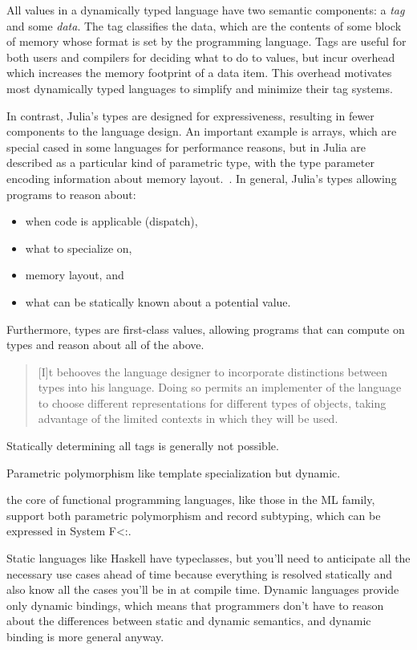 \documentclass[pldi]{sigplanconf-pldi15}
\begin{document}
All values in a dynamically typed language have two semantic components:
a \emph{tag} and some \emph{data}. The tag classifies the data, which are the
contents of some block of memory whose format is set by the programming
language. Tags are useful for both users and compilers for deciding what to do
to values, but incur overhead which increases the memory footprint of a data
item. This overhead motivates most dynamically typed languages to simplify and
minimize their tag systems.

In contrast, Julia's types are designed for expressiveness, resulting in fewer
components to the language design. An important example is arrays, which are
special cased in some languages for performance reasons, but in Julia are
described as a particular kind of parametric type, with the type parameter
encoding information about memory layout.~\cite{Bezanson2014}. In general,
Julia's types allowing programs to reason about:

\begin{itemize}
\item when code is applicable (dispatch),
\item what to specialize on,
\item memory layout, and
\item what can be statically known about a potential value.
\end{itemize}
%
Furthermore, types are first-class values, allowing programs that can compute
on types and reason about all of the above.

\begin{quote}
	[I]t behooves the language designer to incorporate distinctions between
	types into his language. Doing so permits an implementer of the
	language to choose different representations for different types of
	objects, taking advantage of the limited contexts in which they will be
	used.
\end{quote}

Statically determining all tags is generally not possible.

Parametric polymorphism like template specialization but dynamic.

the core of functional programming languages, like those in the ML family, support both parametric polymorphism and record subtyping, which can be expressed in System F<:.

Static languages like Haskell have typeclasses\cite{typeclass}, but you'll need
to anticipate all the necessary use cases ahead of time because everything is
resolved statically and also know all the cases you'll be in at compile time.
Dynamic languages provide only dynamic bindings, which means that programmers
don't have to reason about the differences between static and dynamic
semantics, and dynamic binding is more general anyway.
\end{document}
